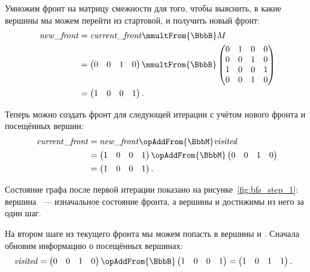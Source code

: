 \begin{example}
    Умножим фронт на матрицу смежности для того, чтобы выяснить, в какие вершины мы можем перейти из стартовой, и получить новый фронт:
    \begin{align*}
        \mathit{new\_front} & = \mathit{current\_front} \mmultFrom{\BbbB} M \\
                          & =
        \begin{pmatrix}
            0 & 0 & 1 & 0
        \end{pmatrix} \mmultFrom{\BbbB}
        \begin{pmatrix}
            0 & 1 & 0 & 0 \\
            0 & 0 & 1 & 0 \\
            1 & 0 & 0 & 1 \\
            0 & 0 & 1 & 0
        \end{pmatrix}                                              \\
                          & =
        \begin{pmatrix}
            1 & 0 & 0 & 1
        \end{pmatrix}.
    \end{align*}

    Теперь можно создать фронт для следующей итерации с учётом нового фронта и посещённых вершин:
    \begin{align*}
        \mathit{current\_front} & = \mathit{new\_front} \opAddFrom{\BbbM} \mathit{visited}
        \\
                              & =
        \begin{pmatrix}
            1 & 0 & 0 & 1
        \end{pmatrix}\opAddFrom{\BbbM}
        \begin{pmatrix}
            0 & 0 & 1 & 0
        \end{pmatrix}                                                          \\
                              & =
        \begin{pmatrix}
            1 & 0 & 0 & 1
        \end{pmatrix}.
    \end{align*}

    Состояние графа после первой итерации показано на рисунке~\ref{fig:bfs_step_1}: вершина ~--- изначальное состояние фронта, а вершины  и  достижимы из него за один шаг.

    На втором шаге из текущего фронта мы можем попасть в вершины  и .
    Сначала обновим информацию о посещённых вершинах:
    \begin{align*}
        \mathit{visited} & =
        \begin{pmatrix}
            0 & 0 & 1 & 0
        \end{pmatrix}\opAddFrom{\BbbB}
        \begin{pmatrix}
            1 & 0 & 0 & 1
        \end{pmatrix} =
        \begin{pmatrix}
            1 & 0 & 1 & 1
        \end{pmatrix}.
    \end{align*}


\end{example}
